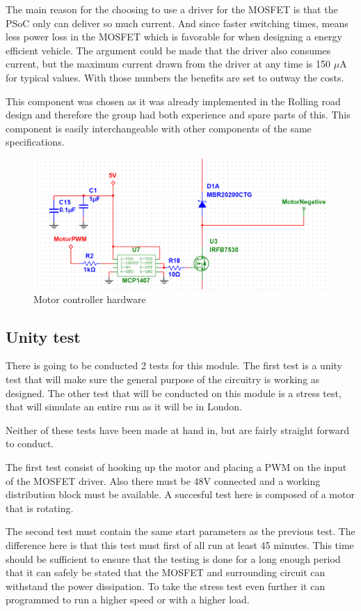 The main reason for the choosing to use a driver for the MOSFET is that the PSoC only can deliver so much current. And since faster switching times, means less power loss in the MOSFET which is favorable for when designing a energy efficient vehicle. The argument could be made that the driver also consumes current, but the maximum current drawn from the driver at any time is 150 $\mu $A for typical values. With those numbers the benefits are set to outway the costs.  

This component was chosen as it was already implemented in the Rolling road design and therefore the group had both experience and spare parts of this. This component is easily interchangeable with other components of the same specifications. 

\begin{figure}[H]
	\centering
	\includegraphics[width=0.85\linewidth]{Hardware/Pictures/Motorstyring}
	\caption{Motor controller hardware}
	\label{fig:Motorcontroller}
\end{figure}


\subsection{Unity test}
There is going to be conducted 2 tests for this module. The first test is a unity test that will make sure the general purpose of the circuitry is working as designed. The other test that will be conducted on this module is a stress test, that will simulate an entire run as it will be in London. 

Neither of these tests have been made at hand in, but are fairly straight forward to conduct. 

The first test consist of hooking up the motor and placing a PWM on the input of the MOSFET driver. Also there must be 48V connected and a working distribution block must be available. A succesful test here is composed of a motor that is rotating. 

The second test must contain the same start parameters as the previous test. The difference here is that this test must first of all run at least 45 minutes. This time should be sufficient to ensure that the testing is done for a long enough period that it can safely be stated that the MOSFET and surrounding circuit can withstand the power dissipation. To take the stress test even further it can programmed to run a higher speed or with a higher load. 